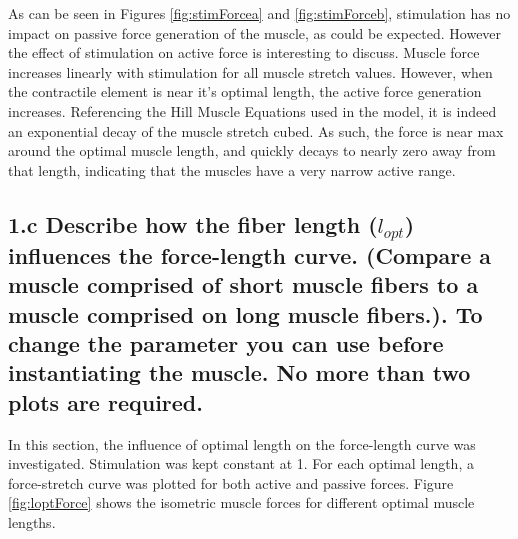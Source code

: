 \documentclass{cmc}
\begin{document}
As can be seen in  Figures \ref{fig:stimForcea} and \ref{fig:stimForceb}, stimulation has no impact on passive force generation of the muscle, as could be expected. However the effect of stimulation on active force is interesting to discuss. Muscle force increases linearly with stimulation for all muscle stretch values. However, when the contractile element is near it's optimal length, the active force generation increases. Referencing the Hill Muscle Equations used in the model, it is indeed an exponential decay of the muscle stretch cubed. As such, the force is near max around the optimal muscle length, and quickly decays to nearly zero away from that length, indicating that the muscles have a very narrow active range. 

\subsection*{1.c Describe how the fiber length ($l_{opt}$) influences
  the force-length curve. (Compare a muscle comprised of short muscle
  fibers to a muscle comprised on long muscle fibers.). To change the
  parameter you can use
   before
  instantiating the muscle. No more than two plots are required. }

In this section, the influence of optimal length on the force-length curve was investigated. Stimulation was kept constant at 1. For each optimal length, a force-stretch curve was plotted for both active and passive forces. Figure \ref{fig:loptForce} shows the isometric muscle forces for different optimal muscle lengths. 
\end{document}
